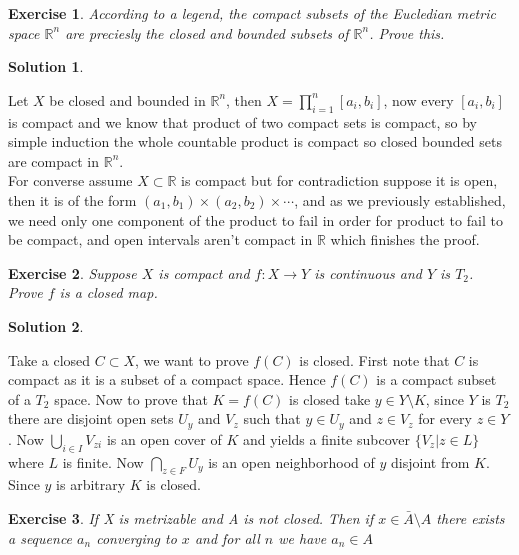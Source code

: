 \documentclass[11pt,a4paper]{article}
\newtheorem{Ex}{Exercise}
\newtheorem{Sol}{Solution}
\begin{document}
\begin{Ex}
	According to a legend, the compact subsets of the Eucledian metric space $\mathbb{R}^n$ are preciesly the closed and bounded subsets of $\mathbb{R}^n$. Prove this.
\end{Ex}

\begin{Sol} \end{Sol}
Let $X$ be closed and bounded in $\mathbb{R}^n$, then $X = \prod_{i=1}^{n}[a_i,b_i]$, now every $[a_i,b_i]$ is compact and we know that product of two compact sets is compact, so by simple induction the whole countable product is compact so closed bounded sets are compact in $\mathbb{R}^n$. \\
For converse assume $X \subset \mathbb{R}$ is compact but for contradiction suppose it is open, then it is of the form $(a_1,b_1) \times (a_2,b_2) \times \cdots $, and as we previously established, we need only one component of the product to fail in order for product to fail to be compact, and open intervals aren't compact in $\mathbb{R}$ which finishes the proof.

\begin{Ex}
	Suppose $X$ is compact and $f: X \rightarrow Y$ is continuous and $Y$ is $T_2$. Prove $f$ is a closed map.
\end{Ex}  

\begin{Sol}\end{Sol}
\noindent Take a closed $C \subset X$, we want to prove $f(C)$ is closed. First note that $C$ is compact as it is a subset of a compact space. Hence $f(C)$ is a compact subset of a $T_2$ space. Now to prove that $K = f(C)$ is closed take $y \in Y\setminus K$, since $Y$ is $T_2$ there are disjoint open sets $U_y$ and $V_z$ such that $y\in U_y$ and $z\in V_z$ for every $z\in Y$. Now $\bigcup_{i\in I} V_{zi}$ is an open cover of $K$ and yields a finite subcover $\{V_z | z \in L\}$ where $L$ is finite. Now $\bigcap_{z \in F}U_y$ is an open neighborhood of $y$ disjoint from $K$. Since $y$ is arbitrary $K$ is closed.   

\begin{Ex}
	If X is metrizable and A is not closed. Then if $x \in \bar{A}\setminus A$ there exists a sequence $a_n$ converging to $x$ and for all $n$ we have $a_n \in A$
\end{Ex}
\end{document}
